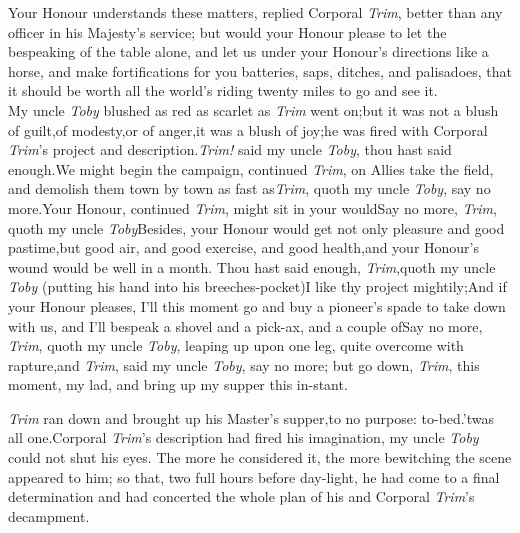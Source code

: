 \documentclass{article}
\begin{document}
Your Honour understands these matters, replied Corporal
\textit{Trim}, better than any officer in his Majesty’s
service;\tsk\break
but would your Honour please to let the bespeaking of the
table alone, and let us 
under your Honour’s directions like a horse, and make
fortifications for you
batteries, saps, ditches, and palisadoes, that it
should be worth all the world’s\break
riding twenty miles to go and see it.\\
\newpage
My uncle \textit{Toby} blushed as red as scarlet as \textit{Trim}
went on;\tsk but it was not a blush of guilt,\tsk of
modesty,\tsk or of anger,\tsk it was a blush of joy;\tsk he
was fired with Corporal \textit{Trim}’s project and
description.\tsk \textit{Trim!} said my uncle \textit{Toby}, thou
hast said enough.\tsk We might begin the campaign, continued
\textit{Trim}, on\break
{}
Allies take the field, and demolish them town by town as fast
as\tsh \textit{Trim}, quoth\break
my uncle \textit{Toby}, say no more.\tsk Your
Honour, continued \textit{Trim}, might sit in your 
would\tsh Say no more, \textit{Trim}, quoth my uncle
\textit{Toby}\tsh Besides, your Honour would get not only
pleasure and good pastime,\tsk but good air, and good exercise,
and good health,\tsk and your Honour’s
wound would be well in a month.
Thou hast said enough, \textit{Trim},\tsk quoth my
uncle \textit{Toby} (putting his hand into his breeches-pocket)\tsh I like thy project
mightily;\tsk And if your Honour pleases, I’ll this moment
go and buy a pioneer’s spade to take down with us, and
I’ll bespeak a shovel and a pick-ax, and a couple
of\tsh Say no more, \textit{Trim}, quoth my uncle
\textit{Toby}, leaping up upon one leg, quite overcome with
rapture,\tsk and\break
{}
\textit{Trim}, said my uncle \textit{Toby}, say no
more;\tsk\break
but go down, \textit{Trim}, this moment, my lad, and
bring up my supper this in-\break stant.

\textit{Trim} ran down and brought up his Master’s
supper,\tsk to no purpose:\tsh\break
{}
to-bed.\tsk ’twas all one.\tsk Corporal \textit{Trim}’s
description had fired his imagination,\tsk\break
my uncle \textit{Toby} could not shut his eyes.\tsk\break
The more he considered it, the more 
bewitching the scene appeared to him;\tsk\break
so that, two full hours before day-light, he had
come to a final determination and had concerted the whole plan of his\break
and Corporal \textit{Trim}’s decampment.
\end{document}
